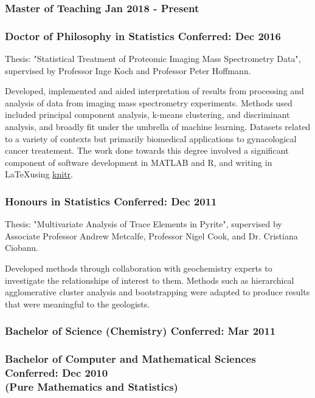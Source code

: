 \documentclass[a4paper,12pt]{report}
\begin{document}
\subsubsection*{Master of Teaching \hfill Jan 2018 - Present}

\subsubsection*{Doctor of Philosophy in Statistics \hfill Conferred: Dec 2016} \vspace{-6pt}
Thesis: "Statistical Treatment of Proteomic Imaging Mass Spectrometry Data", supervised by Professor Inge Koch and Professor Peter Hoffmann.

Developed, implemented and aided interpretation of results from processing and analysis of data from imaging mass spectrometry experiments. Methods used included principal component analysis, k-means clustering, and discriminant analysis, and broadly fit under the umbrella of machine learning. Datasets related to a variety of contexts but primarily biomedical applications to gynacological cancer treatement. The work done towards this degree involved a significant component of software development in MATLAB and R, and writing in \LaTeX using  \href{https://yihui.name/knitr/}{knitr}.

\subsubsection*{Honours in Statistics \hfill Conferred: Dec 2011} \vspace{-6pt}
Thesis: "Multivariate Analysis of Trace Elements in Pyrite", supervised by Associate Professor Andrew Metcalfe, Professor Nigel Cook, and Dr. Cristiana Ciobanu.

Developed methods through collaboration with geochemistry experts to investigate the relationships of interest to them. Methods such as hierarchical agglomerative cluster analysis and bootstrapping were adapted to produce results that were meaningful to the geologists.


\subsubsection*{Bachelor of Science (Chemistry) \hfill Conferred: Mar 2011}

\subsubsection*{Bachelor of Computer and Mathematical Sciences \hfill Conferred: Dec 2010 \\ (Pure Mathematics and Statistics)}
\end{document}
